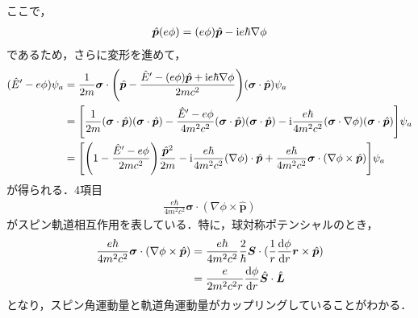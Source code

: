 \documentclass{report}
\begin{document}
  ここで，
  \begin{align}
    \hat{\bm{p}}(e\phi) = (e\phi)\hat{\bm{p}} - \mathrm{i} e \hbar \nabla\phi
  \end{align}
  であるため，さらに変形を進めて，
  \begin{align}
    (\hat{E}' - e\phi) \psi_a &= \frac{1}{2m}\bm{\sigma}\cdot\qty(\hat{\bm{p}} - \frac{\hat{E}' - (e\phi)\hat{\bm{p}} + \mathrm{i} e\hbar \nabla\phi}{2mc^2})(\bm{\sigma}\cdot\hat{\bm{p}}) \psi_a\\
    &= \qty[\frac{1}{2m}(\bm{\sigma}\cdot\hat{\bm{p}})(\bm{\sigma}\cdot\hat{\bm{p}}) - \frac{\hat{E}' - e\phi}{4m^2c^2}(\bm{\sigma}\cdot\hat{\bm{p}})(\bm{\sigma}\cdot\hat{\bm{p}}) - \mathrm{i} \frac{e\hbar}{4m^2c^2}(\bm{\sigma}\cdot\nabla\phi)(\bm{\sigma}\cdot\hat{\bm{p}})]\psi_a\\
    &= \qty[\qty(1 - \frac{\hat{E}' - e\phi}{2mc^2})\frac{\hat{\bm{p}}^2}{2m} - \mathrm{i} \frac{e\hbar}{4m^2c^2}(\nabla\phi)\cdot\hat{\bm{p}} + \frac{e\hbar}{4m^2c^2}\bm{\sigma}\cdot(\nabla\phi\times\hat{\bm{p}})]\psi_a
  \end{align}
  が得られる．4項目
  \begin{align}
    \frac{e\hbar}{4m^2c^2}\bm{\sigma}\cdot(\nabla\phi\times\hat{\bm{p}})
  \end{align}
  がスピン軌道相互作用を表している．特に，球対称ポテンシャルのとき，
  \begin{align}
    \frac{e\hbar}{4m^2c^2}\bm{\sigma}\cdot(\nabla\phi\times\hat{\bm{p}}) &= \frac{e\hbar}{4m^2c^2}\frac{2}{\hbar}\bm{\bm{S}}\cdot(\frac{1}{r}\dv{\phi}{r}\bm{r}\times\hat{\bm{p}})\\
    &= \frac{e}{2m^2c^2r}\dv{\phi}{r}\hat{\bm{S}}\cdot\hat{\bm{L}}
  \end{align}
  となり，スピン角運動量と軌道角運動量がカップリングしていることがわかる．
\end{document}
